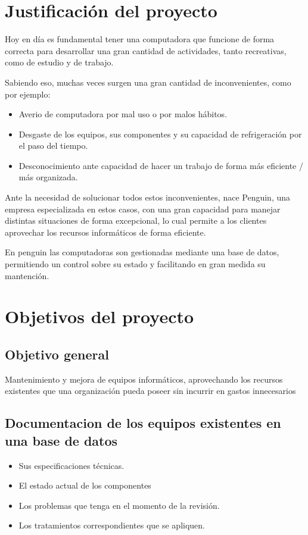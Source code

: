 \documentclass{article}
\begin{document}
\section{Justificación del proyecto}
	Hoy en día es fundamental tener una computadora que funcione 
	de forma correcta para desarrollar una gran cantidad de actividades, 
	tanto recreativas, como de estudio y de trabajo.
	
	Sabiendo eso, muchas veces surgen una gran cantidad de inconvenientes,
	como por ejemplo:
	\begin{itemize}
	\item Averio de computadora por mal uso o por malos hábitos.
	\item Desgaste de los equipos, sus componentes y su capacidad de refrigeración por el paso del tiempo.
	\item Desconocimiento ante capacidad de hacer un trabajo de forma más eficiente / más organizada.
	\end{itemize}

	Ante la necesidad de solucionar todos estos inconvenientes, nace Penguin, 
	una empresa especializada en estos casos, con una gran capacidad para 
	manejar distintas situaciones de forma excepcional, lo cual permite 
	a los clientes aprovechar los recursos informáticos de forma eficiente.
	
	En penguin las computadoras son gestionadas mediante una base de datos, 
	permitiendo un control sobre su estado y facilitando en gran medida su mantención.


\section{Objetivos del proyecto}
	\subsection{Objetivo general}
		Mantenimiento y mejora de equipos informáticos, aprovechando 
		los recursos existentes que una organización pueda poseer 
		sin incurrir en gastos innecesarios

	\subsection{Documentacion de los equipos existentes en una base de datos}
		\begin{itemize}
		\item Sus especificaciones técnicas.
		\item El estado actual de los componentes
		\item Los problemas que tenga en el momento de la revisión.
		\item Los tratamientos correspondientes que se apliquen.
		\end{itemize}
		
\end{document}
